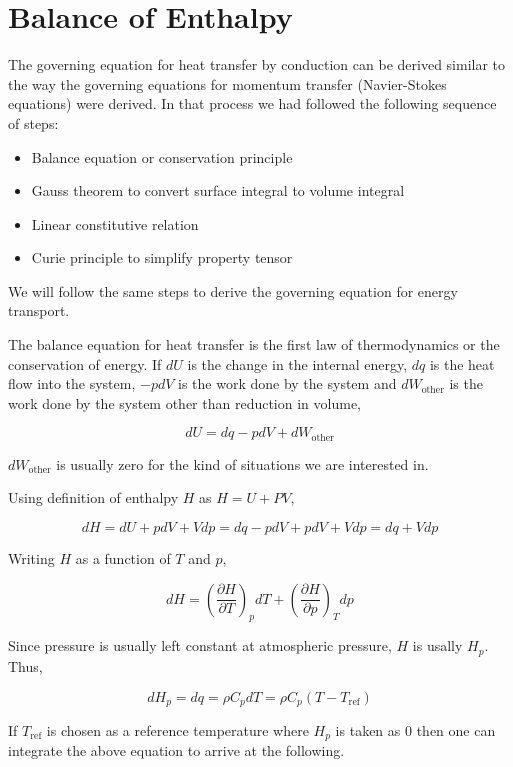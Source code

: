 
\section{Balance of Enthalpy}

The governing equation for heat transfer by conduction can be derived similar to the way the governing equations for momentum transfer (Navier-Stokes equations) were derived. In that process we had followed the following sequence of steps:
\begin{itemize}
\item Balance equation or conservation principle
\item Gauss theorem to convert surface integral to volume integral
\item Linear constitutive relation
\item Curie principle to simplify property tensor
\end{itemize}

We will follow the same steps to derive the governing equation for energy transport.

The balance equation for heat transfer is the first law of thermodynamics or the conservation of energy. If $dU$ is the change in the internal energy, $dq$ is the heat flow into the system, $-pdV$ is the work done by the system and $dW_{\text{other}}$ is the work done by the system other than reduction in volume,

$$dU = dq - pdV + dW_{\text{other}}$$

$dW_{\text{other}}$ is usually zero for the kind of situations we are interested in.

Using definition of enthalpy $H$ as $H = U + PV$,

$$dH = dU + pdV + Vdp = dq - pdV + pdV + V dp = dq + Vdp$$

Writing $H$ as a function of $T$ and $p$,

$$dH = \left( \frac{\partial H}{\partial T} \right)_p dT + \left( \frac{\partial H}{\partial p} \right)_T dp $$

Since pressure is usually left constant at atmospheric pressure, $H$ is usally $H_p$. Thus,

\begin{equation}
\boxed{
dH_p = dq = \rho C_p dT = \rho C_p (T - T_\text{ref})
}
\label{hrhocp}
\end{equation}

If $T_\text{ref}$ is chosen as a reference temperature where $H_p$ is taken as $0$ then one can integrate the above equation to arrive at the following.

